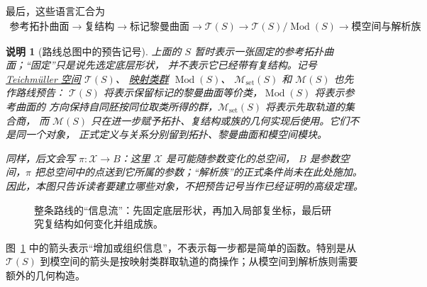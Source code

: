 \documentclass[UTF8,fontset=none,a4paper,11pt]{ctexart}
\theoremstyle{foundation-definition}
\theoremstyle{foundation-theorem}
\theoremstyle{foundation-proposition}
\theoremstyle{foundation-example}
\theoremstyle{foundation-remark}
\newtheorem{remark}[definition]{说明}
\theoremstyle{foundation-theorem}
\newcommand{\T}{\mathcal T}
\newcommand{\M}{\mathcal M}
\newcommand{\Mod}{\operatorname{Mod}}
\newcommand{\term}[2]{\hyperref[#1]{#2}}
\begin{document}
最后，这些语言汇合为
\[
\begin{gathered}
\text{参考拓扑曲面}
\longrightarrow
\text{复结构}
\longrightarrow
\text{标记黎曼曲面}
\longrightarrow
\T(S)
\longrightarrow
\T(S)/\Mod(S)
\longrightarrow
\text{模空间与解析族}
\end{gathered}
\]

\begin{remark}[路线总图中的预告记号]\label{rem:roadmap-notation}
上面的 \(S\) 暂时表示一张固定的参考拓扑曲面；“固定”只是说先选定底层形状，
并不表示它已经带有复结构。记号
\term{def:teich}{Teichmüller 空间} \(\T(S)\)、
\term{def:mapping-class}{映射类群} \(\Mod(S)\)、
\(\M_{\mathrm{set}}(S)\) 和 \(\M(S)\) 也先作路线预告：
\(\T(S)\) 将表示保留标记的黎曼曲面等价类，\(\Mod(S)\) 将表示参考曲面的
方向保持自同胚按同位取类所得的群，\(\M_{\mathrm{set}}(S)\) 将表示先取轨道的集合商，
而 \(\M(S)\) 只在进一步赋予拓扑、复结构或族的几何实现后使用。它们不是同一个对象，
正式定义与关系分别留到拓扑、黎曼曲面和模空间模块。

同样，后文会写 \(\pi:\mathcal X\to B\)：这里 \(\mathcal X\) 是可能随参数变化的总空间，
\(B\) 是参数空间，\(\pi\) 把总空间中的点送到它所属的参数；“解析族”的正式条件尚未在此处施加。
因此，本图只告诉读者要建立哪些对象，不把预告记号当作已经证明的高级定理。
\end{remark}

\begin{figure}[htbp]
\centering
{}
\caption{整条路线的“信息流”：先固定底层形状，再加入局部复坐标，最后研究复结构如何变化并组成族。}
\label{fig:route-overview}
\end{figure}

图~\ref{fig:route-overview} 中的箭头表示“增加或组织信息”，不表示每一步都是简单的函数。特别是从 \(\T(S)\) 到模空间的箭头是按映射类群取轨道的商操作；从模空间到解析族则需要额外的几何构造。
\end{document}
